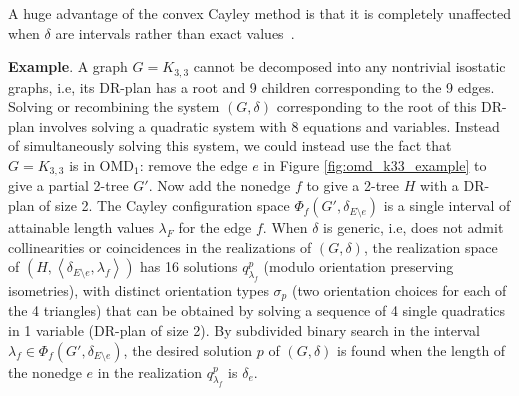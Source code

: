 \noindent
\note A huge advantage of the convex Cayley method is that it is
completely unaffected when $\delta$ are intervals rather than exact
values~\cite{sitharam2010convex}.



\medskip\noindent
\textbf{Example}. 
A graph $G=K_{3,3}$  cannot be decomposed into any nontrivial
isostatic graphs, i.e, its DR-plan has a root and 9 children
corresponding to the 9 edges. Solving or recombining the system
$(G,\delta)$ corresponding to the root of this DR-plan involves
solving a quadratic system with 8 equations and variables. Instead of
simultaneously solving this system, we could instead use the fact that
$G=K_{3,3}$ is in OMD$_1$: remove the edge $e$ in Figure
\ref{fig:omd_k33_example} to give a partial 2-tree $G'$. Now add the
nonedge $f$ to give a 2-tree $H$ with a DR-plan of size 2. The Cayley
configuration space $\Phi_f(G', \delta_{E\setminus e})$ is a single
interval of attainable length values $\lambda_F$ for the edge $f$.
When $\delta$ is generic, i.e, does not admit collinearities or
coincidences in the realizations of $(G,\delta)$, the realization
space of $(H, \left<\delta_{E\setminus e}, \lambda_f\right>)$ has 16
solutions $q^p_{\lambda_f}$ (modulo orientation preserving
isometries), with distinct orientation types $\sigma_p$ (two
orientation choices for each of the 4 triangles) that can be obtained
by solving a sequence of 4 single quadratics in 1 variable (DR-plan of
size 2). By subdivided binary search in the interval $\lambda_f \in
\Phi_f(G', \delta_{E\setminus e})$, the desired solution $p$  of
$(G,\delta)$ is found when the length of the nonedge $e$ in  the
realization $q^p_{\lambda_f}$ is $\delta_e$.
%
